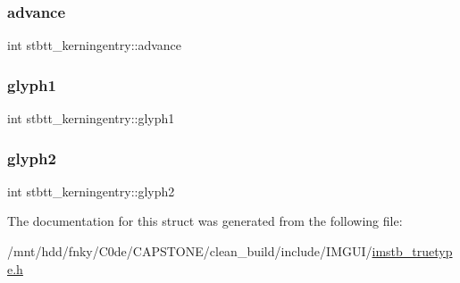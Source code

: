 \subsubsection{\texorpdfstring{advance}{advance}}
{\footnotesize\ttfamily int stbtt\+\_\+kerningentry\+::advance}

\mbox{\label{structstbtt__kerningentry_a395848ac004ad9193c532ebc08b07f91}} 
\subsubsection{\texorpdfstring{glyph1}{glyph1}}
{\footnotesize\ttfamily int stbtt\+\_\+kerningentry\+::glyph1}

\mbox{\label{structstbtt__kerningentry_a9d5a83a93bb6a40bed5c166c5f295c61}} 
\subsubsection{\texorpdfstring{glyph2}{glyph2}}
{\footnotesize\ttfamily int stbtt\+\_\+kerningentry\+::glyph2}



The documentation for this struct was generated from the following file\+:\begin{DoxyCompactItemize}
\item 
/mnt/hdd/fnky/\+C0de/\+C\+A\+P\+S\+T\+O\+N\+E/clean\+\_\+build/include/\+I\+M\+G\+U\+I/\hyperlink{imstb__truetype_8h}{imstb\+\_\+truetype.\+h}\end{DoxyCompactItemize}
